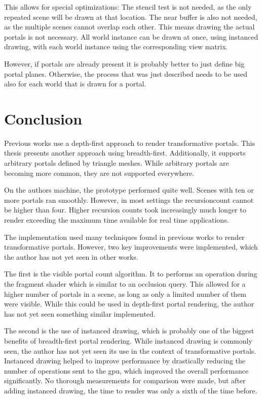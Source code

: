 This allows for special optimizations: The stencil test is not needed, as the only repeated scene will be drawn at that location. The near buffer is also not needed, as the multiple scenes cannot overlap each other. This means drawing the actual portals is not necessary. All world instance can be drawn at once, using instanced drawing, with each world instance using the corresponding view matrix.

However, if portals are already present it is probably better to just define big portal planes. Otherwise, the process that was just described needs to be used also for each world that is drawn for a portal.


\chapter{Conclusion}


Previous works use a depth-first approach to render transformative portals. This thesis presents another approach using breadth-first. Additionally, it supports arbitrary portals defined by triangle meshes. While arbitrary portals are becoming more common, they are not supported everywhere.

On the authors machine, the prototype performed quite well. Scenes with ten or more portals ran smoothly. However, in most settings the \gls{recursioncount} cannot be higher than four. Higher recursion counts took increasingly much longer to render exceeding the maximum time available for real time applications.



The implementation used many techniques found in previous works to render transformative portals. However, two key improvements were implemented, which the author has not yet seen in other works.

The first is the visible portal count algorithm. It to performs an operation during the fragment shader which is similar to an occlusion query. This allowed for a higher number of portals in a scene, as long as only a limited number of them were visible. While this could be used in depth-first portal rendering, the author has not yet seen something similar implemented.

The second is the use of instanced drawing, which is probably one of the biggest benefits of breadth-first portal rendering. While instanced drawing is commonly seen, the author has not yet seen its use in the context of transformative portals. Instanced drawing helped to improve performance by drastically reducing the number of operations sent to the \gls{gpu}, which improved the overall performance significantly. No thorough measurements for comparison were made, but after adding instanced drawing, the time to render was only a sixth of the time before. 

